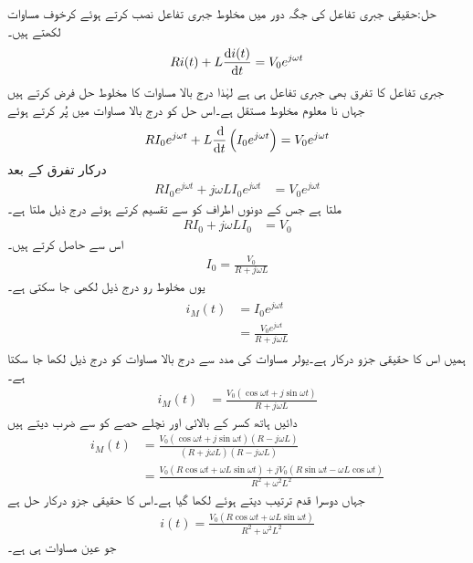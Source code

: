 حل:حقیقی جبری تفاعل  کی جگہ دور میں مخلوط جبری تفاعل  نصب کرتے ہوئے کرخوف مساوات لکھتے ہیں۔
\begin{align*}
R i(t) +L\frac{\dif i(t)}{\dif t}=V_0 e^{j \omega t}
\end{align*}
جبری تفاعل  کا تفرق  بھی جبری تفاعل ہی ہے لہٰذا درج بالا مساوات کا مخلوط حل  فرض  کرتے ہیں جہاں  نا معلوم مخلوط مستقل ہے۔اس حل کو درج بالا مساوات میں پُر کرتے ہوئے
\begin{align*}
R I_0 e^{j\omega t}+L \frac{\dif}{\dif t}\left(I_0 e^{j\omega t} \right)=V_0 e^{j \omega t}
\end{align*}
درکار تفرق کے بعد
\begin{align}\label{مساوات_بدلتا_مخلوط_الف}
R I_0  e^{j \omega t}+j \omega L I_0e^{j\omega t}&=V_0 e^{j \omega t}
\end{align}
ملتا ہے جس کے دونوں اطراف کو  سے تقسیم کرتے ہوئے درج ذیل ملتا ہے۔
\begin{align}\label{مساوات_بدلتا_مخلوط_ب}
R I_0+j \omega L I_0&=V_0 
\end{align}
اس سے  حاصل کرتے ہیں۔
\begin{align}\label{مساوات_بدلتا_مخلوط_مستقل_الف}
I_0=\frac{V_0}{R+j\omega L}
\end{align}
یوں مخلوط رو درج ذیل لکھی جا سکتی ہے۔
\begin{gather}
\begin{aligned}\label{مساوات_بدلتا_مخلوط_پ}
i_M(t)&=I_0 e^{j\omega t}\\
&=\frac{V_0 e^{j\omega t}}{R+j\omega L}
\end{aligned}
\end{gather}
ہمیں اس کا حقیقی جزو درکار ہے۔یولر مساوات کی مدد سے درج بالا مساوات کو درج ذیل لکھا جا سکتا ہے۔
\begin{align*}
i_M(t)&=\frac{V_0 (\cos \omega t+j \sin \omega t)}{R+j\omega L}
\end{align*}
دائیں ہاتھ کسر کے بالائی اور نچلے حصے کو  سے ضرب دیتے ہیں
 \begin{align*}
i_M(t)&=\frac{V_0 (\cos \omega t+j \sin \omega t)(R-j\omega L)}{(R+j\omega L)(R-j\omega L)}\\
&=\frac{V_0(R \cos \omega t+\omega L \sin \omega t)+jV_0(R\sin \omega t-\omega L \cos \omega t)}{R^2+\omega^2 L^2}
\end{align*}
جہاں دوسرا قدم ترتیب دیتے ہوئے لکھا گیا ہے۔اس کا حقیقی جزو درکار حل ہے
\begin{align}\label{مساوات_بدلتا_مخلوط_ت}
i(t)=\frac{V_0(R \cos \omega t+\omega L \sin \omega t)}{R^2+\omega^2 L^2}
\end{align}
جو عین مساوات  ہی ہے۔

